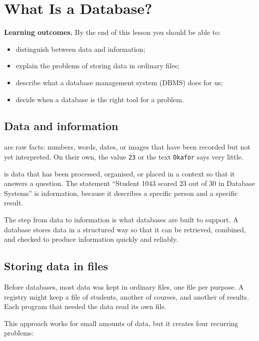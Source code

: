 \section{What Is a Database?}

\begin{note}
\textbf{Learning outcomes.} By the end of this lesson you should be able to:
\begin{itemize}
  \item distinguish between data and information;
  \item explain the problems of storing data in ordinary files;
  \item describe what a database management system (DBMS) does for us;
  \item decide when a database is the right tool for a problem.
\end{itemize}
\end{note}

\subsection{Data and information}

 are raw facts: numbers, words, dates, or images that have been recorded but not yet interpreted. On their own, the value \texttt{23} or the text \texttt{Okafor} says very little.

 is data that has been processed, organised, or placed in a context so that it answers a question. The statement ``Student 1043 scored 23 out of 30 in Database Systems'' is information, because it describes a specific person and a specific result.

The step from data to information is what databases are built to support. A database stores data in a structured way so that it can be retrieved, combined, and checked to produce information quickly and reliably.

\subsection{Storing data in files}

Before databases, most data was kept in ordinary files, one file per purpose. A registry might keep a file of students, another of courses, and another of results. Each program that needed the data read its own file.

This approach works for small amounts of data, but it creates four recurring problems:

